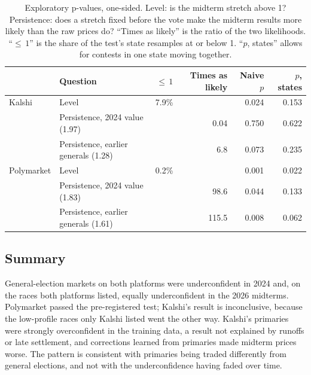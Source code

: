 \begin{table}[tbp]
\centering\small
\caption{Exploratory p-values, one-sided. Level: is the midterm stretch above 1? Persistence: does a stretch fixed
before the vote make the midterm results more likely than the raw prices do? ``Times as likely'' is the ratio of the
two likelihoods. ``${\le}\,1$'' is the share of the test's state resamples at or below 1. ``$p$, states'' allows for contests
in one state moving together.}\label{tab:pvalues}
\setlength{\tabcolsep}{4.5pt}
\begin{tabular}{llrrrr}
\toprule
 & Question & ${\le}\,1$ & Times as likely & Naive $p$ & $p$, states \\
\midrule
Kalshi & Level & 7.9\% & & 0.024 & 0.153 \\
 & Persistence, 2024 value (1.97) & & 0.04 & 0.750 & 0.622 \\
 & Persistence, earlier generals (1.28) & & 6.8 & 0.073 & 0.235 \\
\midrule
Polymarket & Level & 0.2\% & & 0.001 & 0.022 \\
 & Persistence, 2024 value (1.83) & & 98.6 & 0.044 & 0.133 \\
 & Persistence, earlier generals (1.61) & & 115.5 & 0.008 & 0.062 \\
\bottomrule
\end{tabular}
\end{table}

\subsection{Summary}

General-election markets on both platforms were underconfident in 2024 and, on the races both platforms listed,
equally underconfident in the 2026 midterms. Polymarket passed the pre-registered test; Kalshi's result is inconclusive,
because the low-profile races only Kalshi listed went the other way. Kalshi's primaries were strongly overconfident in
the training data, a result not explained by runoffs or late settlement, and corrections learned from primaries made
midterm prices worse. The pattern is consistent with primaries being traded differently from general elections, and
not with the underconfidence having faded over time.
